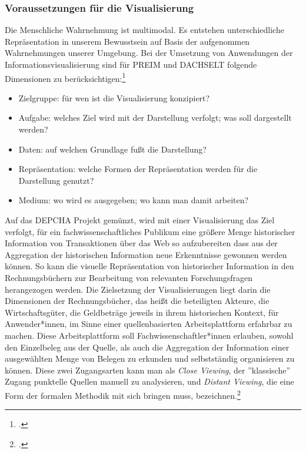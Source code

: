 \documentclass[12pt,a4paper]{article}
\begin{document}
\subsubsection{Voraussetzungen für die Visualisierung}

Die Menschliche Wahrnehmung ist multimodal. Es entstehen unterschiedliche Repräsentation in unserem Bewusstsein auf Basis der aufgenommen Wahrnehmungen unserer Umgebung. Bei der Umsetzung von Anwendungen der Informationsvisualisierung sind für PREIM und DACHSELT folgende Dimensionen zu berücksichtigen:\footcite[][S.437-440]{preim2010interaktive}
\begin{itemize}
    \item Zielgruppe: für wen ist die Visualisierung konzipiert?
    \item Aufgabe: welches Ziel wird mit der Darstellung verfolgt; was soll dargestellt werden?
    \item Daten: auf welchen Grundlage fußt die Darstellung?
    \item Repräsentation: welche Formen der Repräsentation werden für die Darstellung genutzt?
    \item Medium: wo wird es ausgegeben; wo kann man damit arbeiten?
\end{itemize}
Auf das DEPCHA Projekt gemünzt, wird mit einer Visualisierung das Ziel verfolgt, für ein fachwissenschaftliches Publikum eine größere Menge historischer Information von Transaktionen über das Web so aufzubereiten  dass aus der Aggregation der historischen Information neue Erkenntnisse gewonnen werden können. So kann die visuelle Repräsentation von historischer Information in den Rechnungsbüchern zur Bearbeitung von relevanten Forschungsfragen herangezogen werden. Die Zielsetzung der Visualisierungen liegt darin die Dimensionen der Rechnungsbücher, das heißt die beteiligten Akteure, die Wirtschaftsgüter, die Geldbeträge jeweils in ihrem historischen Kontext, für Anwender*innen, im Sinne einer quellenbasierten Arbeitsplattform erfahrbar zu machen. Diese Arbeitsplattform soll Fachwissenschaftler*innen erlauben, sowohl den Einzelbeleg aus der Quelle, als auch die Aggregation der Information einer ausgewählten Menge von Belegen zu erkunden und selbstständig organisieren zu können. Diese zwei Zugangsarten kann man als \textit{Close Viewing}, der ''klassische'' Zugang punktelle Quellen manuell zu analysieren, und \textit{Distant Viewing}, die eine Form der formalen Methodik mit sich bringen muss, bezeichnen.\footcite[][]{hsozkult2014closereading} 
\\
\end{document}
